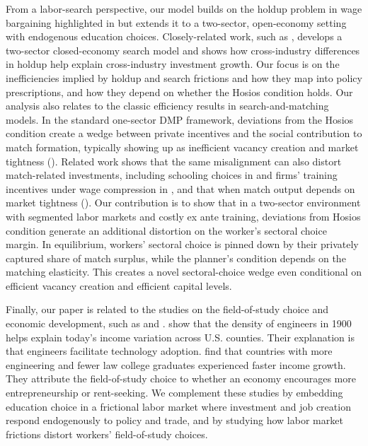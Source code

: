 \documentclass[12pt]{article} %
\theoremstyle{definition}
\begin{document}
From a labor-search perspective,  our model builds on the holdup problem in wage bargaining highlighted in \cite{acemoglu1999holdups} but extends it to a two-sector, open-economy setting with endogenous education choices. Closely-related work, such as \cite{cardullo2015sunk},  develops a two-sector closed-economy  search model  and shows how cross-industry differences in holdup  help explain cross-industry investment growth. Our focus 
is on the  inefficiencies implied by holdup and search frictions and how they map into policy prescriptions, and how they depend on whether the Hosios condition holds. Our analysis also relates to the classic efficiency results in search-and-matching models. In the standard one-sector DMP framework, deviations from the Hosios condition create a wedge between private incentives and the social contribution to match formation, typically showing up as inefficient vacancy creation and market tightness (\citet{Hosios1990,mortensen1994job,pissarides2000equilibrium}). Related work shows that the same misalignment can also distort match-related investments, including schooling choices in \cite{flinn2015labor} and firms’ training incentives under wage compression in \cite{acemoglu1999training}, and that when match output depends on market tightness  (\cite{mangin2021efficiency}). Our contribution is to show that in a two-sector environment with segmented labor markets and costly ex ante training, deviations from Hosios condition generate an additional distortion on the worker's sectoral choice margin. In equilibrium, workers’ sectoral choice is pinned down by their privately captured share of match surplus, while the planner’s condition depends on the matching elasticity. This creates a novel sectoral-choice wedge even conditional on efficient vacancy creation and efficient capital levels.

Finally, our paper is  related to the studies on the field-of-study choice and economic development, such as \cite{maloney2022engineering} and \cite{murphy1991allocation}.  \cite{maloney2022engineering} show that the density of engineers in 1900 helps explain today's  income variation across U.S. counties. Their explanation is that engineers facilitate technology adoption. \cite{murphy1991allocation} find that countries with more engineering and fewer law college graduates experienced faster income growth. They attribute the field-of-study choice to whether an economy encourages more entrepreneurship or rent-seeking. We complement these studies by embedding education choice in a frictional labor market where investment and job creation respond endogenously to policy and trade, and by studying  how labor market frictions distort workers' field-of-study choices. 
\end{document}
